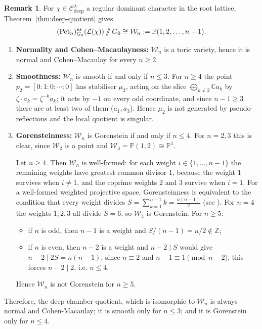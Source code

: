 \documentclass[12pt, reqno]{amsart}
\newcommand{\sslash}{\mathbin{/\mkern-6mu/}}
\theoremstyle{plain}
\numberwithin{equation}{section}
\theoremstyle{definition}
\newtheorem{remark}{Remark}
\begin{document}
\begin{remark}
For $\chi\in\mathcal C_{\mathrm{deep}}^\lambda$
a regular dominant character in the root lattice,
Theorem~\ref{thm:deep-quotient} gives
\[
(\mathrm{Pet}_n)^{ss}_{G_0}(\mathcal L(\chi))
\sslash G_0
\cong
\mathcal W_n
:=
\mathbb P(1,2,\ldots,n-1).
\]
\begin{enumerate}
\item[(i)] \textbf{Normality and Cohen--Macaulayness:}  
$\mathcal W_n$ is a toric variety, hence it is normal and Cohen--Macaulay for every $n \ge 2$.

\item[(ii)] \textbf{Smoothness:}  $\mathcal W_n$ is smooth if and only if $n\le3$. For $n\ge4$ the point
$p_2=[0:1:0:\cdots:0]$ has stabiliser $\mu_2$, acting on the slice
$\bigoplus_{k\neq2}\mathbb C a_k$ by $\zeta\cdot a_k=\zeta^{-k}a_k$; it acts by $-1$ on
every odd coordinate, and since $n-1\ge3$ there are at least two of them ($a_1,a_3$).
Hence $\mu_2$ is not generated by pseudo-reflections and the local quotient is singular.

\item[(iii)] \textbf{Gorensteinness:}
$\mathcal W_n$ is Gorenstein if and only if $n\le 4$. For $n=2,3$ this is clear, since
$\mathcal W_{2}$ is a point and $\mathcal W_{3}=\mathbb P(1,2)\cong\mathbb P^{1}$.

Let $n\ge4$. Then $\mathcal W_{n}$ is well-formed: for each weight $i\in\{1,\dots,n-1\}$ the
remaining weights have greatest common divisor $1$, because the weight $1$ survives when
$i\neq1$, and the coprime weights $2$ and $3$ survive when $i=1$. For a well-formed weighted
projective space, Gorensteinness is equivalent to the condition that every weight divides
$S=\sum_{k=1}^{n-1}k=\frac{n(n-1)}{2}$ (see \cite{Watanabe}). For $n=4$ the weights $1,2,3$ all
divide $S=6$, so $\mathcal W_{4}$ is Gorenstein. For $n\ge5$:
\begin{itemize}
\item if $n$ is odd, then $n-1$ is a weight and $S/(n-1)=n/2\notin\mathbb Z$;
\item if $n$ is even, then $n-2$ is a weight and $n-2\mid S$ would give $n-2\mid 2S=n(n-1)$;
since $n\equiv2$ and $n-1\equiv1 \pmod{n-2}$, this forces $n-2\mid 2$, i.e. $n\le4$.
\end{itemize}
Hence $\mathcal W_{n}$ is not Gorenstein for $n\ge5$.
\end{enumerate}

Therefore, the deep chamber quotient, which is isomorphic to $\mathcal W_n$ is always normal and Cohen-Macaulay; it is smooth only for $n\le3$; and it is Gorenstein only for $n\le4$.
\end{remark}
\end{document}
